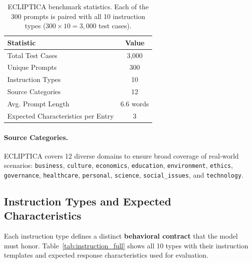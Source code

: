 \begin{table}[H]
\centering
\small
\renewcommand{\arraystretch}{1.2}
\begin{tabular}{@{}lc@{}}
\toprule
\textbf{Statistic} & \textbf{Value} \\
\midrule
Total Test Cases & 3,000 \\ \hline
Unique Prompts & 300 \\ \hline
Instruction Types & 10 \\ \hline
Source Categories & 12 \\ \hline
Avg. Prompt Length & 6.6 words \\ \hline
Expected Characteristics per Entry & 3 \\
\bottomrule
\end{tabular}
\caption{ECLIPTICA benchmark statistics. Each of the 300 prompts is paired with all 10 instruction types ($300 \times 10 = 3{,}000$ test cases).}
\label{tab:ecliptica_stats}
\end{table}

\paragraph{Source Categories.} ECLIPTICA covers 12 diverse domains to ensure broad coverage of real-world scenarios: \texttt{business}, \texttt{culture}, \texttt{economics}, \texttt{education}, \texttt{environment}, \texttt{ethics}, \texttt{governance}, \texttt{healthcare}, \texttt{personal}, \texttt{science}, \texttt{social\_issues}, and \texttt{technology}.

\subsection{Instruction Types and Expected Characteristics}

Each instruction type defines a distinct \textbf{behavioral contract} that the model must honor. Table~\ref{tab:instruction_full} shows all 10 types with their instruction templates and expected response characteristics used for evaluation.

